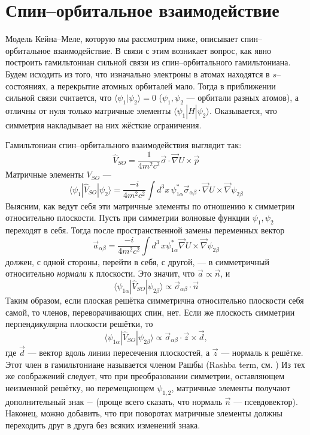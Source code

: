 \section{Спин--орбитальное взаимодействие}
Модель Кейна--Меле, которую мы рассмотрим ниже, описывает спин--орбитальное 
взаимодействие. В связи с этим возникает
вопрос, как явно построить гамильтониан сильной связи из спин--орбитального гамильтониана.
Будем исходить из того, что изначально электроны в атомах находятся в $s$--состояниях,
а перекрытие атомных орбиталей мало. Тогда в приближении сильной связи считается, что
$\langle \psi_1 | \psi_2 \rangle = 0$ ($\psi_1, \psi_2$ --- орбитали разных атомов),
а отличны от нуля только матричные элементы $\langle \psi_1 | \hat{H} | \psi_2 \rangle$.
Оказывается, что симметрия накладывает на них жёсткие ограничения.

Гамильтониан спин--орбитального взаимодействия выглядит так:
\begin{equation}
	\hat{V}_{SO} = \frac{1}{4m^2c^2} \vec{\sigma} \cdot \vec{\nabla} U \times \vec{p}
\end{equation}
Матричные элементы $V_{SO}$ ---
\begin{equation}
\langle \psi_1 | \hat{V}_{SO} | \psi_2 \rangle = 
	\frac{-i}{4m^2c^2}\int d^3 x\, \psi_{1\alpha}^{*} \vec{\sigma}_{\alpha \beta} \cdot
		\vec{\nabla} U \times \vec{\nabla} \psi_{2\beta}
\end{equation}
Выясним, как ведут себя эти матричные элементы по отношению к симметрии относительно 
плоскости. Пусть при симметрии волновые функции $\psi_1, \psi_2$ переходят в себя. Тогда 
после пространственной замены переменных вектор
\begin{equation}
	\vec{a}_{\alpha \beta} = 
	\frac{-i}{4m^2c^2}\int d^3\, x \psi_{1\alpha}^{*} 
		\vec{\nabla} U \times \vec{\nabla} \psi_{2\beta}
\end{equation}
должен, с одной стороны, перейти в себя, с другой, --- в симметричный относительно 
\emph{нормали} к плоскости. Это значит, что $\vec{a} \propto \vec{n}$, и
\begin{equation}
\langle \psi_{1\alpha} | \hat{V}_{SO} | \psi_{2\beta} \rangle \propto \vec{\sigma}_{\alpha \beta} \cdot \vec{n}
\end{equation}
Таким образом,
если плоская решётка симметрична относительно плоскости себя самой, то членов,
переворачивающих спин, нет.
Если же плоскость симметрии перпендикулярна плоскости решётки, то 
\begin{equation}
\langle \psi_{1\alpha} | \hat{V}_{SO} | \psi_{2\beta} \rangle 
	\propto 
	\vec{\sigma}_{\alpha \beta} \cdot \vec{z} \times \vec{d},
\end{equation}
где $\vec{d}$ --- вектор вдоль линии пересечения плоскостей, а $\vec{z}$ --- нормаль к 
решётке. Этот член в гамильтониане называется членом Рашбы (Rashba term, см. \cite{Giglberger2007})
Из тех же соображений следует, что при преобразовании симметрии, оставляющем 
неизменной решётку, но перемещающем $\psi_{1,2}$, матричные элементы получают дополнительный
знак $-$ (проще всего сказать, что нормаль $\vec{n}$ --- псевдовектор). Наконец, можно
добавить, что при поворотах матричные элементы должны переходить друг в друга без 
всяких изменений знака.



